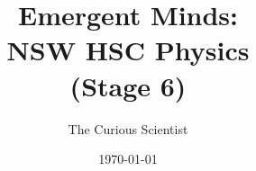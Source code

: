 \documentclass[justified,notoc]{tufte-book}
\title{Emergent Minds: \\NSW HSC Physics\\(Stage 6) }
\author{The Curious Scientist}
\date{\today}
\begin{document}
\maketitle

\tableofcontents


\FloatBarrier



\FloatBarrier


\FloatBarrier


\FloatBarrier


\FloatBarrier


\FloatBarrier


\FloatBarrier


\FloatBarrier


\FloatBarrier
\end{document}
